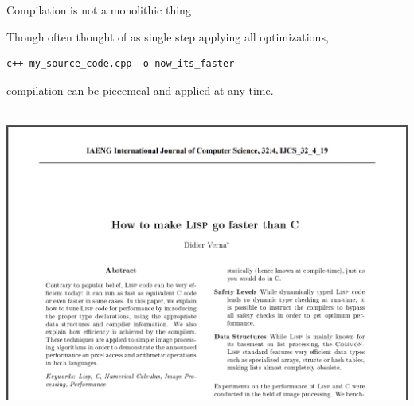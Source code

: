 \documentclass[aspectratio=169]{beamer}
\begin{document}
\begin{frame}[fragile]{Compilation is not a monolithic thing}
\Large

\vspace{0.5 cm}
Though often thought of as single step applying all optimizations,

\vspace{0.2 cm}
\hspace{0.6 cm} \begin{minipage}{0.9\linewidth}
\begin{verbatim}
c++ my_source_code.cpp -o now_its_faster
\end{verbatim}
\end{minipage}

\vspace{0.25 cm}
compilation can be piecemeal and applied at any time.

\vspace{0.5 cm}

\mbox{ } \hfill \includegraphics[height=5 cm]{lisp-faster-than-c.png} \hfill \mbox{ }
\end{frame}
\end{document}
